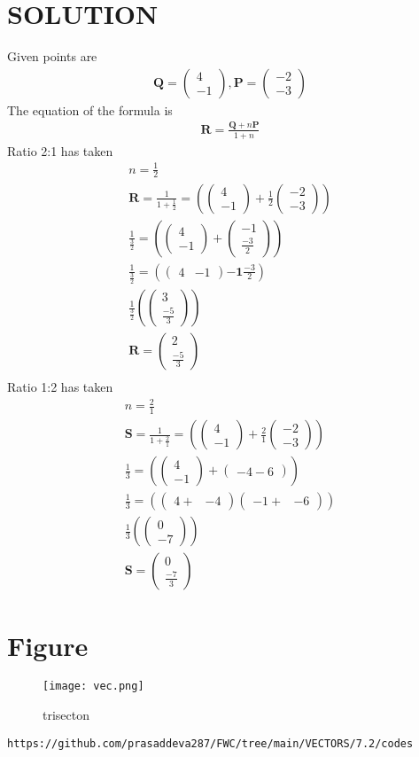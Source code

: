 \documentclass[12pt]{article}
\providecommand{\brak}[1]{\ensuremath{\left(#1\right)}}
\newcommand{\myvec}[1]{\ensuremath{\begin{pmatrix}#1\end{pmatrix}}}
\let\vec\mathbf
\begin{document}
\section{SOLUTION}
Given points are
\begin{align}
\vec{Q}=\myvec{4\\ -1} ,
\vec{P}=\myvec{-2\\ -3}
\end{align}
The equation of the formula is
\begin{align}
\vec{R}=\frac{\vec{Q}+n\vec{P}}{1+n}
\end{align}
Ratio 2:1 has taken 
\begin{align}
n=\frac{1}{2}\\
\vec{R}=\frac{1}{1+\frac{1}{2}}=\brak{\myvec{4\\-1}+\frac{1}{2}\myvec{-2\\-3}}\\
\frac{1}{\frac{3}{2}}=\brak{\myvec{4\\ -1}+\myvec{-1\\ \frac{-3}{2}}}\\
\frac{1}{\frac{3}{2}}=\brak {\myvec{4&-1} {\vec{-1} \frac{-3}{2}}}\\
\frac{1}{\frac{3}{2}}\brak {\myvec{3\\ \frac{-5}{3}}}\\
\vec{R}=\myvec{2\\ \frac{-5}{3}}\\
\end{align}
Ratio 1:2 has taken
\begin{align}
n=\frac{2}{1}\\
\vec{S}=\frac{1}{1+\frac{2}{1}}=\brak{\myvec{4\\-1}+\frac{2}{1}\myvec{-2\\-3}}\\
\frac{1}{3}=\brak{\myvec{4\\ -1}+\myvec{-4-6}}\\
\frac{1}{3}=\brak{\myvec{4+& -4}\myvec{-1+&-6}}\\
\frac{1}{3}\brak{\myvec{0\\ -7}}\\
\vec{S}=\myvec{0\\ \frac{-7}{3}}
\end{align}
\section{Figure}
\begin{figure}[h]
\centering
\texttt{[image: vec.png]}
\caption{trisecton}
		\label{fig:Figure}
\end{figure}
\begin{lstlisting}
https://github.com/prasaddeva287/FWC/tree/main/VECTORS/7.2/codes
\end{lstlisting}
\end{document}
